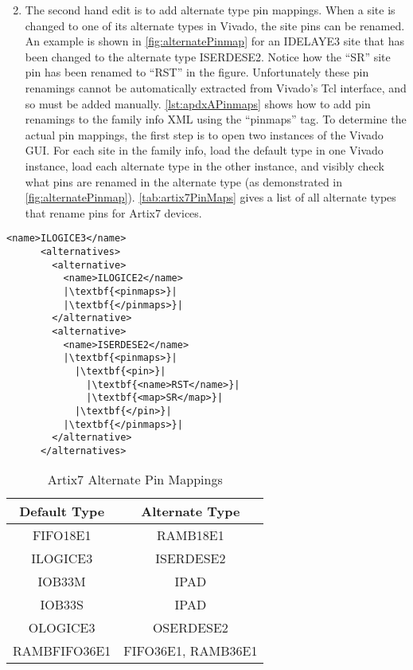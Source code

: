 \begin{enumerate}
\setcounter{enumi}{1}         
      \item  The second hand edit is to add alternate type pin mappings. When a
      site is changed to one of its alternate types in Vivado, the site pins can
      be renamed. An example is shown in \autoref{fig:alternatePinmap} for an
      IDELAYE3 site that has been changed to the alternate type ISERDESE2.
      Notice how the ``SR'' site pin has been renamed to ``RST'' in the figure.
      Unfortunately these pin renamings cannot be automatically extracted from
      Vivado's Tcl interface, and so must be added manually.
      \autoref{lst:apdxAPinmaps} shows how to add pin renamings to the family
      info XML using the ``pinmaps'' tag. To determine the actual pin
      mappings, the first step is to open two instances of the Vivado GUI.
      For each site in the family info, load the default type in one Vivado
      instance, load each alternate type in the other instance, and visibly
      check what pins are renamed in the alternate type (as demonstrated in
      \autoref{fig:alternatePinmap}). \autoref{tab:artix7PinMaps} gives a list
      of all alternate types that rename pins for Artix7 devices.

\end{enumerate}

\begin{lstlisting}[numbers=none, caption=Sample pinmaps in a family info file,
label=lst:apdxAPinmaps] 
      <name>ILOGICE3</name>
      <alternatives>
        <alternative>
          <name>ILOGICE2</name>
          |\textbf{<pinmaps>}|
          |\textbf{</pinmaps>}|
        </alternative>
        <alternative>
          <name>ISERDESE2</name>
          |\textbf{<pinmaps>}|
	        |\textbf{<pin>}|
	          |\textbf{<name>RST</name>}|
	          |\textbf{<map>SR</map>}|
	        |\textbf{</pin>}|
          |\textbf{</pinmaps>}|
        </alternative>
      </alternatives>
\end{lstlisting}
	  
\begin{table} [h!]
    \caption{Artix7 Alternate Pin Mappings}
	\begin{center}
	\begin{tabu}{ |c|c| }
	\hline
	\textbf{Default Type} & \textbf{Alternate Type} \\
	\hline
	\hline 
	FIFO18E1 & RAMB18E1 \\
	\hline
	ILOGICE3 & ISERDESE2 \\
	\hline
	IOB33M & IPAD \\
	\hline
	IOB33S & IPAD \\
	\hline
	OLOGICE3 & OSERDESE2 \\
	\hline
	RAMBFIFO36E1 & FIFO36E1, RAMB36E1 \\
	\hline
	\end{tabu}
	\label{tab:artix7PinMaps}
	\end{center}
\end{table}

